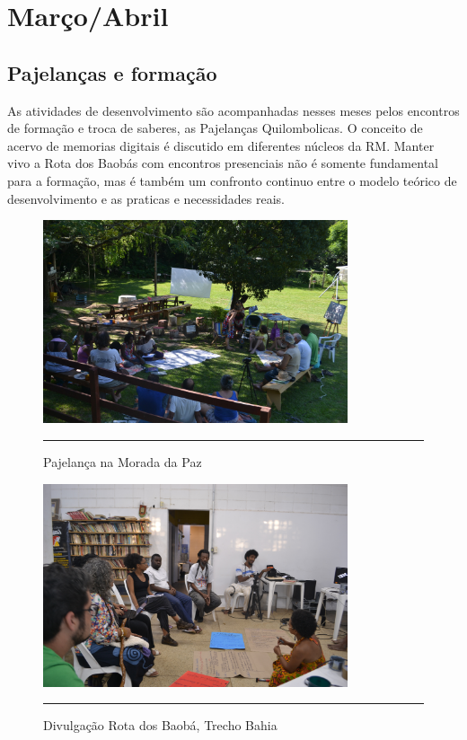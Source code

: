 \documentclass[a4paper, 11pt, oneside]{Relatorio_sem_2}  %
\begin{document}
\part{Março/Abril} %

\chapter{Pajelanças e formação}

As atividades de desenvolvimento são acompanhadas nesses meses pelos
encontros de formação e troca de saberes, as Pajelanças Quilombolicas.
O conceito de acervo de memorias digitais é discutido em diferentes
núcleos da RM. Manter vivo a Rota dos Baobás com encontros presenciais
não é somente fundamental para a formação, mas é também um confronto
continuo entre o modelo teórico de desenvolvimento e as praticas e
necessidades reais. 

\begin{figure}[htbp]
  \centering
  \includegraphics[width=0.8\textwidth]{./Fig/Formacao_RS_1_2014.pdf}
  \rule{35em}{0.5pt}
  \caption[Pajelança na Morada da Paz]{Pajelança na Morada da Paz}
  \label{fig:PajMoradaRS2014}
\end{figure}

\begin{figure}[htbp]
  \centering
  \includegraphics[width=0.8\textwidth]{./Fig/Formacao_Taina_1_2014.pdf}
  \rule{35em}{0.5pt}
  \caption[Pajelança na Casa de Cultura Tainã]{Divulgação Rota dos
    Baobá, Trecho Bahia}
  \label{fig:PajTainaSP2014}
\end{figure}
\end{document}
